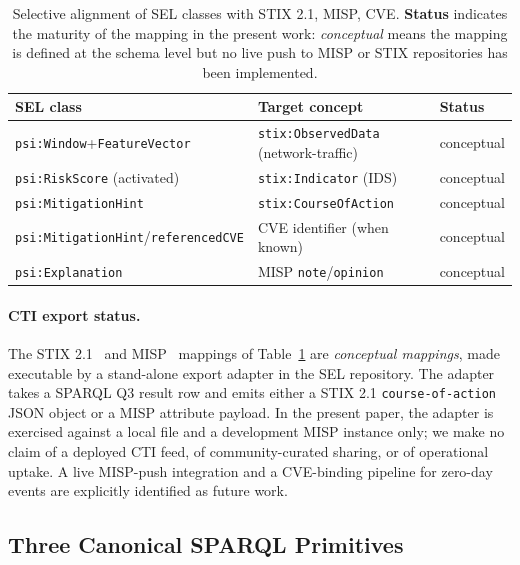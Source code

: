 \documentclass[runningheads]{llncs}
\begin{document}
\begin{table}[t]
\centering
\caption{Selective alignment of SEL classes with STIX 2.1, MISP, CVE.
\textbf{Status} indicates the maturity of the mapping in the present
work: \emph{conceptual} means the mapping is defined at the schema
level but no live push to MISP or STIX repositories has been
implemented.}
\label{tab:stix}
\small
\begin{tabular}{@{}lll@{}}
\toprule
\textbf{SEL class}                 & \textbf{Target concept}            & \textbf{Status} \\
\midrule
\texttt{psi:Window}+\texttt{FeatureVector}
                                   & \texttt{stix:ObservedData} (network-traffic)
                                                                        & conceptual \\
\texttt{psi:RiskScore} (activated) & \texttt{stix:Indicator} (IDS)      & conceptual \\
\texttt{psi:MitigationHint}        & \texttt{stix:CourseOfAction}       & conceptual \\
\texttt{psi:MitigationHint}/\texttt{referencedCVE}
                                   & CVE identifier (when known)        & conceptual \\
\texttt{psi:Explanation}           & MISP \texttt{note}/\texttt{opinion}& conceptual \\
\bottomrule
\end{tabular}
\end{table}

\paragraph{CTI export status.} The STIX 2.1~\cite{stix21} and
MISP~\cite{misp} mappings of Table~\ref{tab:stix} are \emph{conceptual
mappings}, made executable by a stand-alone export adapter in the SEL
repository. The adapter takes a SPARQL Q3 result row and emits either a
STIX 2.1 \texttt{course-of-action} JSON object or a MISP attribute
payload. In the present paper, the adapter is exercised against a local
file and a development MISP instance only; we make no claim of a
deployed CTI feed, of community-curated sharing, or of operational
uptake. A live MISP-push integration and a CVE-binding pipeline for
zero-day events are explicitly identified as future work.

\subsection{Three Canonical SPARQL Primitives}
\label{sec:sel-primitives}
\end{document}
